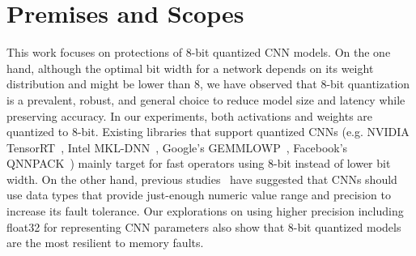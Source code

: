 \documentclass{article}
\newcommand{\TODO}[1]{{\it \color{blue}\{TODO: #1\}}}
\begin{document}




\section{Premises and Scopes}

This work focuses on protections of 8-bit quantized CNN models. 
On the one hand, although the optimal bit width for a network depends on its weight distribution and might be lower than 8, we have observed that 8-bit quantization is a prevalent, robust, and general choice to reduce model size and latency while preserving accuracy. In our experiments, both activations and weights are quantized to 8-bit. Existing libraries that support quantized CNNs (e.g. NVIDIA TensorRT~\cite{migacz20178}, Intel MKL-DNN~\cite{MKLDNN}, Google's GEMMLOWP~\cite{jacob2017gemmlowp}, Facebook's QNNPACK~\cite{QNNPACK}) mainly target for fast operators using 8-bit instead of lower bit width.
On the other hand, previous studies~\cite{li2017understanding, reagen2018ares} have suggested that CNNs should use data types that provide just-enough numeric value range and precision to increase its fault tolerance. Our explorations on using higher precision including float32 for representing CNN parameters also show that 8-bit quantized models are the most resilient to memory faults. 
\end{document}
